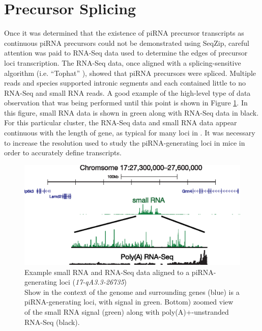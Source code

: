\section{Precursor Splicing}
  \label{SeqZipMethod:sec:piRNA precursors are spliced}

  Once it was determined that the existence of piRNA precursor transcripts as continuous piRNA precursors could not be demonstrated using SeqZip, careful attention was paid to RNA-Seq data used to determine the edges of precursor loci transcription. The RNA-Seq data, once aligned with a splicing-sensitive algorithm (i.e. ``Tophat'' \citep{Trapnell2009}), showed that piRNA precursors were spliced. Multiple reads and species supported intronic segments and each contained little to no RNA-Seq and small RNA reads. A good example of the high-level type of data observation that was being performed until this point is shown in Figure \ref{SeqZipMethod:fig:evidence for precusor splicing}. In this figure, small RNA data is shown in green along with RNA-Seq data in black. For this particular cluster, the RNA-Seq data and small RNA data appear continuous with the length of gene, as typical for many loci in \flies{}. It was necessary to increase the resolution used to study the piRNA-generating loci in mice in order to accurately define transcripts.

  \begin{figure} %
    \centering 
    \includegraphics{Figures/SeqZipMethod/evidenceForPrecursorSplicing.eps}
    \caption[Example small RNA and RNA-Seq data aligned to a piRNA-generating loci]
    {
      Example small RNA and RNA-Seq data aligned to a piRNA-generating loci (\textit{17-qA3.3-26735})\\[0.25cm]
      Show in the context of the genome and surrounding genes (blue) is a piRNA-generating loci, with signal in green. Bottom) zoomed view of the small RNA signal (green) along with poly(A)+-unstranded RNA-Seq (black).
      }
    \label{SeqZipMethod:fig:evidence for precusor splicing}
    \end{figure}

